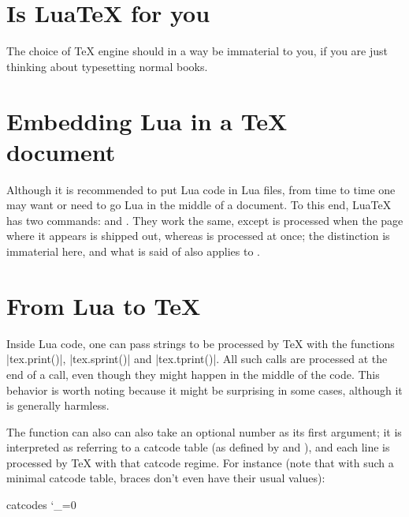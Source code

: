 \section{Is LuaTeX for you}

The choice of TeX engine should in a way be immaterial to you, if you are just thinking about typesetting normal books.

\section{Embedding Lua in a TeX document}

\begin{macro}{\directlua}
Although it is recommended to put Lua code in Lua files, from time to time one may want or need to go Lua in the middle of a document. To this end, LuaTeX has two commands: \cmd{\directlua} and \cmd{\latelua}. They work the same, except \cmd{\latelua} is processed when the page where it appears is shipped out, whereas \cmd{\directlua} is processed at once; the distinction is immaterial here, and what is said of \cmd{\directlua} also applies to \cmd{\latelua}.
\end{macro}

\section{From Lua to TeX}

Inside Lua code, one can pass strings to be processed by TeX with the functions |tex.print()|, |tex.sprint()| and |tex.tprint()|. All such calls are processed at the end of a \cmd{\directlua} call, even though they might happen in the middle of the code. This behavior is worth noting because it might be surprising in some cases, although it is generally harmless.

The function can also can also take an optional number as its first argument; it is interpreted as referring to a catcode table (as defined by \cmd{\initcatcodetable} and \cmd{\savecatcodetable}), and each line is processed by TeX with that catcode regime. For instance (note that with such a minimal catcode table, braces don't even have their usual values):

\begin{texexample}{catcodes}{}
\bgroup
{}
\catcode`\_=0
\egroup
{}
\end{texexample}

